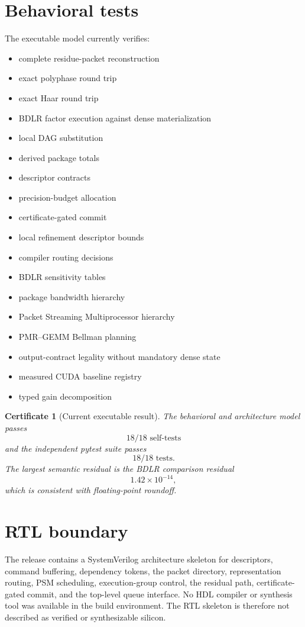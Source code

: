 \documentclass[11pt,oneside,openany]{book}
\newtheorem{certificate}[definition]{Certificate}
\theoremstyle{remark}
\begin{document}
\section{Behavioral tests}
The executable model currently verifies:
\begin{itemize}
\item complete residue-packet reconstruction
\item exact polyphase round trip
\item exact Haar round trip
\item BDLR factor execution against dense materialization
\item local DAG substitution
\item derived package totals
\item descriptor contracts
\item precision-budget allocation
\item certificate-gated commit
\item local refinement descriptor bounds
\item compiler routing decisions
\item BDLR sensitivity tables
\item package bandwidth hierarchy
\item Packet Streaming Multiprocessor hierarchy
\item PMR--GEMM Bellman planning
\item output-contract legality without mandatory dense state
\item measured CUDA baseline registry
\item typed gain decomposition
\end{itemize}

\begin{certificate}[Current executable result]
The behavioral and architecture model passes
\[
\boxed{18/18\text{ self-tests}}
\]
and the independent pytest suite passes
\[
\boxed{18/18\text{ tests}.}
\]
The largest semantic residual is the BDLR comparison residual
\[
1.42\times10^{-14},
\]
which is consistent with floating-point roundoff.
\end{certificate}

\section{RTL boundary}
The release contains a SystemVerilog architecture skeleton for descriptors, command buffering, dependency tokens, the packet directory, representation routing, PSM scheduling, execution-group control, the residual path, certificate-gated commit, and the top-level queue interface. No HDL compiler or synthesis tool was available in the build environment. The RTL skeleton is therefore not described as verified or synthesizable silicon.
\end{document}
